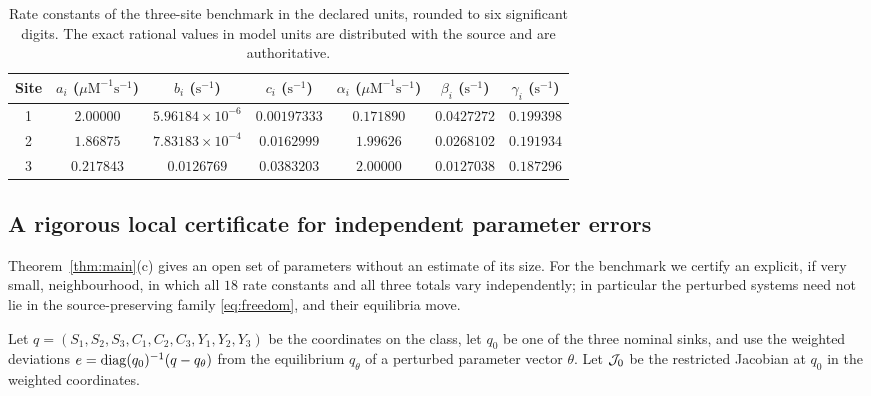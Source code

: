 \begin{table}[ht]
\centering
\caption{Rate constants of the three-site benchmark in the declared units, rounded to six
significant digits. The exact rational values in model units are distributed with the
source and are authoritative.}\label{tab:rates}
\begin{tabular}{ccccccc}
\toprule
Site & \(a_i\) (\(\mu\mathrm M^{-1}\mathrm s^{-1}\)) & \(b_i\) (\(\mathrm s^{-1}\)) &
\(c_i\) (\(\mathrm s^{-1}\)) & \(\alpha_i\) (\(\mu\mathrm M^{-1}\mathrm s^{-1}\)) &
\(\beta_i\) (\(\mathrm s^{-1}\)) & \(\gamma_i\) (\(\mathrm s^{-1}\))\\
\midrule
1 & \(2.00000\) & \(5.96184\times10^{-6}\) & \(0.00197333\) & \(0.171890\) & \(0.0427272\) & \(0.199398\)\\
2 & \(1.86875\) & \(7.83183\times10^{-4}\) & \(0.0162999\) & \(1.99626\) & \(0.0268102\) & \(0.191934\)\\
3 & \(0.217843\) & \(0.0126769\) & \(0.0383203\) & \(2.00000\) & \(0.0127038\) & \(0.187296\)\\
\bottomrule
\end{tabular}
\end{table}

\subsection{A rigorous local certificate for independent parameter errors}
Theorem~\ref{thm:main}(c) gives an open set of parameters without an estimate of its size. For
the benchmark we certify an explicit, if very small, neighbourhood, in which all \(18\) rate
constants and all three totals vary independently; in particular the perturbed systems need
not lie in the source-preserving family \eqref{eq:freedom}, and their equilibria move.

Let \(q=(S_1,S_2,S_3,C_1,C_2,C_3,Y_1,Y_2,Y_3)\) be the coordinates on the class, let \(q_0\) be
one of the three nominal sinks, and use the weighted deviations
\(e=\operatorname{diag}(q_0)^{-1}(q-q_\theta)\) from the equilibrium \(q_\theta\) of a perturbed parameter
vector \(\theta\). Let \(\mathcal J_0\) be the restricted Jacobian at \(q_0\) in the weighted
coordinates.

